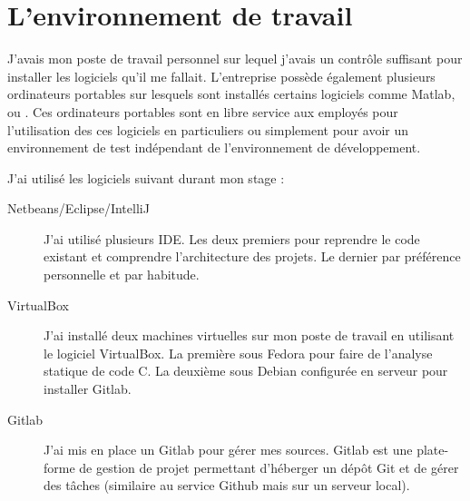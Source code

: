 \section{L'environnement de travail}
J'avais mon poste de travail personnel sur lequel j'avais un contrôle suffisant pour installer les logiciels qu'il me fallait.
L'entreprise possède également plusieurs ordinateurs portables sur lesquels sont installés certains logiciels comme Matlab\up{\circledR},  ou . Ces ordinateurs portables sont en libre service aux employés pour l'utilisation des ces logiciels en particuliers ou simplement pour avoir un environnement de test indépendant de l'environnement de développement.

J'ai utilisé les logiciels suivant durant mon stage :
\begin{description}
  \item[Netbeans/Eclipse/IntelliJ] J'ai utilisé plusieurs IDE. Les deux premiers pour reprendre le code existant et comprendre l'architecture des projets. Le dernier par préférence personnelle et par habitude.
  \item[VirtualBox] J'ai installé deux machines virtuelles sur mon poste de travail en utilisant le logiciel VirtualBox. La première sous Fedora pour faire de l'analyse statique de code C. La deuxième sous Debian configurée en serveur pour installer Gitlab.
  \item[Gitlab] J'ai mis en place un Gitlab pour gérer mes sources. Gitlab est une plate-forme de gestion de projet permettant d'héberger un dépôt Git et de gérer des tâches (similaire au service Github mais sur un serveur local).
\end{description}

